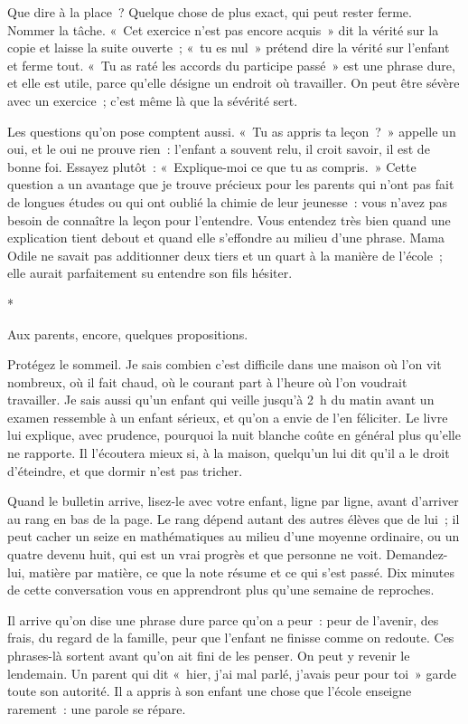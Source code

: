 \documentclass[10.5pt,twoside,openright]{book}
\newcommand{\asterisme}{\par\vspace{0.7em}\centerline{\color{gris}*\quad*\quad*}\vspace{0.7em}\par\noindent}
\begin{document}
Que dire à la place ? Quelque chose de plus exact, qui peut rester ferme. Nommer la tâche. « Cet exercice n’est pas encore acquis » dit la vérité sur la copie et laisse la suite ouverte ; « tu es nul » prétend dire la vérité sur l’enfant et ferme tout. « Tu as raté les accords du participe passé » est une phrase dure, et elle est utile, parce qu’elle désigne un endroit où travailler. On peut être sévère avec un exercice ; c’est même là que la sévérité sert.

Les questions qu’on pose comptent aussi. « Tu as appris ta leçon ? » appelle un oui, et le oui ne prouve rien : l’enfant a souvent relu, il croit savoir, il est de bonne foi. Essayez plutôt : « Explique-moi ce que tu as compris. » Cette question a un avantage que je trouve précieux pour les parents qui n’ont pas fait de longues études ou qui ont oublié la chimie de leur jeunesse : vous n’avez pas besoin de connaître la leçon pour l’entendre. Vous entendez très bien quand une explication tient debout et quand elle s’effondre au milieu d’une phrase. Mama Odile ne savait pas additionner deux tiers et un quart à la manière de l’école ; elle aurait parfaitement su entendre son fils hésiter.

\asterisme

Aux parents, encore, quelques propositions.

Protégez le sommeil. Je sais combien c’est difficile dans une maison où l’on vit nombreux, où il fait chaud, où le courant part à l’heure où l’on voudrait travailler. Je sais aussi qu’un enfant qui veille jusqu’à 2 h du matin avant un examen ressemble à un enfant sérieux, et qu’on a envie de l’en féliciter. Le livre lui explique, avec prudence, pourquoi la nuit blanche coûte en général plus qu’elle ne rapporte. Il l’écoutera mieux si, à la maison, quelqu’un lui dit qu’il a le droit d’éteindre, et que dormir n’est pas tricher.

Quand le bulletin arrive, lisez-le avec votre enfant, ligne par ligne, avant d’arriver au rang en bas de la page. Le rang dépend autant des autres élèves que de lui ; il peut cacher un seize en mathématiques au milieu d’une moyenne ordinaire, ou un quatre devenu huit, qui est un vrai progrès et que personne ne voit. Demandez-lui, matière par matière, ce que la note résume et ce qui s’est passé. Dix minutes de cette conversation vous en apprendront plus qu’une semaine de reproches.

Il arrive qu’on dise une phrase dure parce qu’on a peur : peur de l’avenir, des frais, du regard de la famille, peur que l’enfant ne finisse comme on redoute. Ces phrases-là sortent avant qu’on ait fini de les penser. On peut y revenir le lendemain. Un parent qui dit « hier, j’ai mal parlé, j’avais peur pour toi » garde toute son autorité. Il a appris à son enfant une chose que l’école enseigne rarement : une parole se répare.
\end{document}
